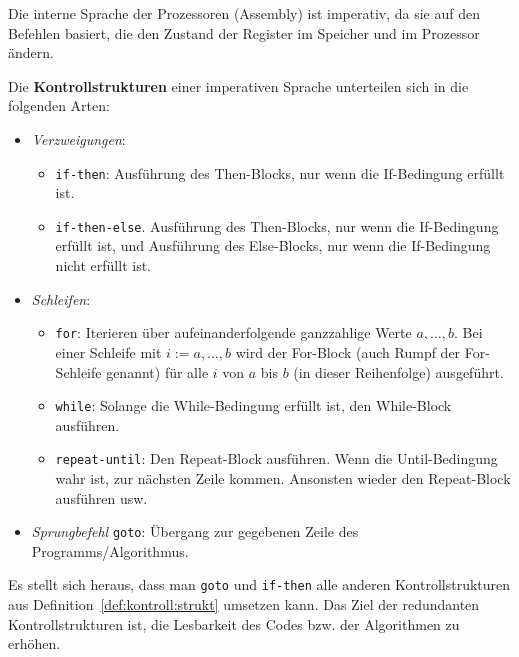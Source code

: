 \begin{bem}
	Die interne Sprache der Prozessoren (Assembly) ist imperativ, da sie auf den Befehlen basiert, die den Zustand der Register im Speicher und im Prozessor ändern. 
\end{bem} 

\begin{defn} \label{def:kontroll:strukt}
Die \textbf{Kontrollstrukturen} einer imperativen Sprache unterteilen sich in die folgenden Arten: 
\begin{itemize}
	\item \emph{Verzweigungen}: 
		\begin{itemize} 
			\item[] \texttt{if-then}: Ausführung des Then-Blocks, nur wenn die If-Bedingung erfüllt ist. 
			\item[] \texttt{if-then-else}.  Ausführung des Then-Blocks, nur wenn die If-Bedingung erfüllt ist, und Ausführung des Else-Blocks, nur wenn die If-Bedingung nicht erfüllt ist. 
		\end{itemize} 
	\item \emph{Schleifen}: 
		\begin{itemize} 
			\item[] \texttt{for}: Iterieren über aufeinanderfolgende ganzzahlige Werte $a,\ldots,b$. Bei einer Schleife mit $i:=a,\ldots,b$ wird der For-Block (auch Rumpf der For-Schleife genannt) für alle $i$ von $a$ bis $b$ (in dieser Reihenfolge) ausgeführt. 
			\item[] \texttt{while}: Solange die While-Bedingung erfüllt ist, den While-Block ausführen.
			\item[] \texttt{repeat-until}: Den Repeat-Block ausführen. Wenn die Until-Bedingung wahr ist, zur nächsten Zeile kommen. Ansonsten wieder den Repeat-Block ausführen usw. 
		\end{itemize} 
	\item \emph{Sprungbefehl} \texttt{goto}: Übergang zur gegebenen Zeile des Programms/Algorithmus. 
\end{itemize}
\end{defn} 

\begin{bem}
	Es stellt sich heraus, dass man \texttt{goto} und \texttt{if-then} alle anderen Kontrollstrukturen aus Definition~\ref{def:kontroll:strukt} umsetzen kann. Das Ziel der redundanten Kontrollstrukturen ist, die Lesbarkeit des Codes bzw. der Algorithmen zu erhöhen. 
\end{bem} 

